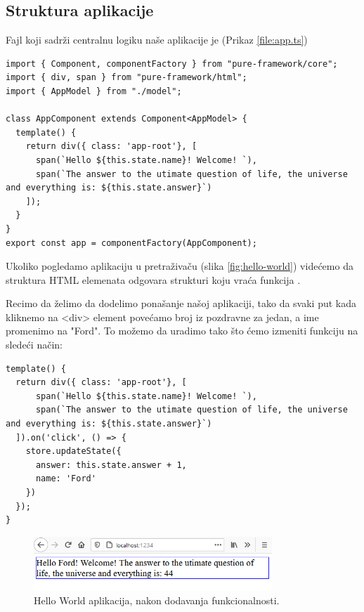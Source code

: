 \documentclass[12pt,oneside]{memoir}
\newcommand{\code}[1]{\colorbox{codegray}{\texttt{\scalebox{0.9}{#1}}}}%
\begin{document}
\subsection{Struktura aplikacije}

Fajl koji sadrži centralnu logiku naše aplikacije je \code{src/App.ts} (Prikaz \ref{file:app.ts})
\begin{lstlisting}[style=jsStyle, caption={Sadržaj fajla \code{App.ts}},label=file:app.ts]
import { Component, componentFactory } from "pure-framework/core";
import { div, span } from "pure-framework/html";
import { AppModel } from "./model";

class AppComponent extends Component<AppModel> {
  template() {
    return div({ class: 'app-root'}, [
      span(`Hello ${this.state.name}! Welcome! `),
      span(`The answer to the utimate question of life, the universe and everything is: ${this.state.answer}`)
    ]);
  }
}
export const app = componentFactory(AppComponent);
\end{lstlisting}

Ukoliko pogledamo aplikaciju u pretraživaču (slika \ref{fig:hello-world})
videćemo da struktura HTML elemenata odgovara strukturi koju vraća funkcija \code{template()}.

Recimo da želimo da dodelimo ponašanje našoj aplikaciji, tako da svaki put kada
kliknemo na <div> element povećamo broj iz pozdravne za jedan, a ime promenimo na "Ford".
To možemo da uradimo tako što ćemo izmeniti funkciju \code{template()} na sledeći način:

\begin{lstlisting}[style=jsStyle, firstnumber=6, caption={Fajl \code{App.ts} nakon dodate funkcionalnosti},label=file:app.ts:2]
template() {
  return div({ class: 'app-root'}, [
      span(`Hello ${this.state.name}! Welcome! `),
      span(`The answer to the utimate question of life, the universe and everything is: ${this.state.answer}`)
  ]).on('click', () => {
    store.updateState({
      answer: this.state.answer + 1,
      name: 'Ford'
    })
  });
}
\end{lstlisting}
\pagebreak
\begin{figure}[!ht]
  \centering
  \includegraphics[width=0.8\textwidth]{slike/hello-ford.PNG}
  \caption{Hello World aplikacija, nakon dodavanja funkcionalnosti.}
  \label{fig:hello-ford}
\end{figure}
\end{document}
